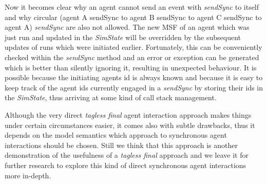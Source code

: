 Now it becomes clear why an agent cannot send an event with \textit{sendSync} to itself and why circular (agent A sendSync to agent B sendSync to agent C sendSync to agent A) \textit{sendSync} are also not allowed. The new MSF of an agent which was just run and updated in the \textit{SimState} will be overridden by the subsequent updates of runs which were initiated earlier. Fortunately, this can be conveniently checked within the \textit{sendSync} method and an error or exception can be generated which is better than silently ignoring it, resulting in unexpected behaviour. It is possible because the initiating agents id is always known and because it is easy to keep track of the agent ids currently engaged in a \textit{sendSync} by storing their ids in the \textit{SimState}, thus arriving at some kind of call stack management.

Although the very direct \textit{tagless final} agent interaction approach makes things under certain circumstances easier, it comes also with subtle drawbacks, thus it depends on the model semantics which approach to synchronous agent interactions should be chosen. Still we think that this approach is another demonstration of the usefulness of a \textit{tagless final} approach and we leave it for further research to explore this kind of direct synchronous agent interactions more in-depth.